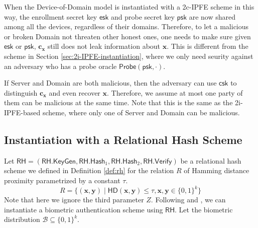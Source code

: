 When the Device-of-Domain model is instantiated with a 2c-IPFE scheme in this way, the enrollment secret key $\textsf{esk}$ and probe secret key $\textsf{psk}$ are now shared among all the devices, regardless of their domains. Therefore, to let a malicious or broken \textsf{Domain} not threaten other honest ones, one needs to make sure given $\textsf{esk}$ or $\textsf{psk}$, $\mathbf{c_x}$ still does not leak information about $\mathbf{x}$. This is different from the scheme in Section \ref{sec:2i-IPFE-instantiation}, where we only need seurity against an adversary who has a probe oracle $\textsf{Probe}(\textsf{psk}, \cdot)$.

If \textsf{Server} and \textsf{Domain} are both malicious, then the adversary can use $\textsf{csk}$ to distinguish $\mathbf{c_x}$ and even recover $\mathbf{x}$. Therefore, we assume at most one party of them can be malicious at the same time. Note that this is the same as the 2i-IPFE-based scheme, where only one of \textsf{Server} and \textsf{Domain} can be malicious.


\subsection{Instantiation with a Relational Hash Scheme}
\label{sec:rh-instantiation}

Let $\textsf{RH} = (\textsf{RH.KeyGen}, \textsf{RH.Hash}_1, \textsf{RH.Hash}_2, \textsf{RH.Verify})$ be a relational hash scheme we defined in Definition \ref{def:rh} for the relation $R$ of Hamming distance proximity parametrized by a constant $\tau$.
\[
	R = \{ (\mathbf{x}, \mathbf{y}) \mid \textsf{HD}(\mathbf{x}, \mathbf{y}) \leq \tau, \mathbf{x}, \mathbf{y} \in \{0,1\}^k \}
\]
Note that here we ignore the third parameter $Z$.
Following \cite{cryptoeprint:2023/481} and \cite{cryptoeprint:2014/394}, we can instantiate a biometric authentication scheme using $\textsf{RH}$.  Let the biometric distribution $\mathcal{B} \subseteq \{0,1\}^k$.

